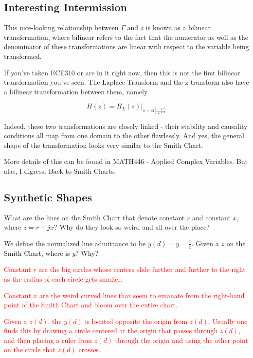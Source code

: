 \documentclass{article}
\begin{document}
\vfill

\subsection{Interesting Intermission}

This nice-looking relationship between $\Gamma$ and $z$ is known as a bilinear transformation, where bilinear refers to the fact that the numerator as well as the denominator of these transformations are linear with respect to the variable being transformed.

If you've taken ECE310 or are in it right now, then this is not the first bilinear transformation you've seen. The Laplace Transform and the z-transform also have a bilinear transformation between them, namely

$$H(z) = H_L(s) \vert_{s = \alpha \frac{1 - z^{-1}}{1+z^{-1}}}$$

Indeed, these two transformations are closely linked - their stability and causality conditions all map from one domain to the other flawlessly. And yes, the general shape of the transformation looks very similar to the Smith Chart.

More details of this can be found in MATH446 - Applied Complex Variables. But alas, I digress. Back to Smith Charts.

\newpage

\subsection{Synthetic Shapes}

What are the lines on the Smith Chart that denote constant $r$ and constant $x$, where $z = r + jx$? Why do they look so weird and all over the place?

We define the normalized line admittance to be $y(d) = y = \frac{1}{z}$. Given a $z$ on the Smith Chart, where is $y$? Why?

\textcolor{red}{Constant $r$ are the big circles whose centers slide further and further to the right as the radius of each circle gets smaller.}

\textcolor{red}{Constant $x$ are the weird curved lines that seem to emanate from the right-hand point of the Smith Chart and bloom over the entire chart.}

\textcolor{red}{Given a $z(d)$, the $y(d)$ is located opposite the origin from $z(d)$. Usually one finds this by drawing a circle centered at the origin that passes through $z(d)$, and then placing a ruler from $z(d)$ through the origin and using the other point on the circle that $z(d)$ crosses.}
\end{document}
